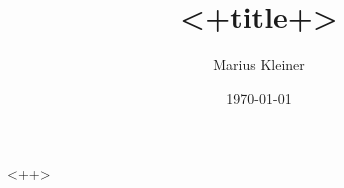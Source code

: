 \documentclass[a4paper]{article}
\title{<+title+>}
\author{Marius Kleiner}
\date{\today}
\begin{document}
\maketitle

<++>

%
\end{document}
